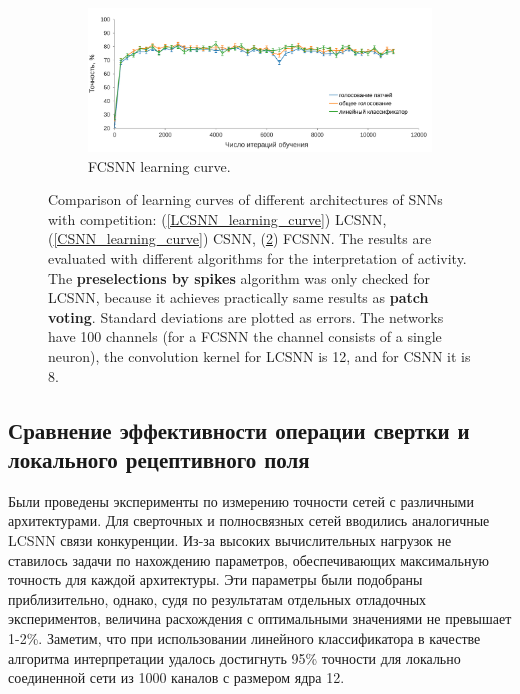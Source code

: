 \documentclass[a4paper]{article}
\begin{document}
\begin{figure}\ContinuedFloat
\begin{subfigure}{0.48\textwidth} 
    \includegraphics[width=\textwidth,keepaspectratio=true]{FCSNN_learning_rate_ru.pdf}
 \caption{FCSNN learning curve.}
 \label{FCSNN_learning_curve}
\end{subfigure}
\caption{Comparison of learning curves of different architectures of SNNs with competition: (\ref{LCSNN_learning_curve}) LCSNN, (\ref{CSNN_learning_curve}) CSNN, (\ref{FCSNN_learning_curve}) FCSNN. The results are evaluated with different algorithms for the interpretation of activity. The \textbf{preselections by spikes} algorithm was only checked for LCSNN, because it achieves practically same results as \textbf{patch voting}. Standard deviations are plotted as errors. The networks have 100 channels (for a FCSNN the channel consists of a single neuron), the convolution kernel for LCSNN is 12, and for CSNN it is 8.}
\end{figure}

\subsection{Сравнение эффективности операции свертки и локального рецептивного поля}
Были проведены эксперименты по измерению точности сетей с различными архитектурами. Для сверточных и полносвязных сетей вводились аналогичные LCSNN связи конкуренции. Из-за высоких вычислительных нагрузок не ставилось задачи по нахождению параметров, обеспечивающих максимальную точность для каждой архитектуры. Эти параметры были подобраны приблизительно, однако, судя по результатам отдельных отладочных экспериментов, величина расхождения с оптимальными значениями не превышает 1-2\%. Заметим, что при использовании линейного классификатора в качестве алгоритма интерпретации удалось достигнуть 95\% точности для локально соединенной сети из 1000 каналов с размером ядра 12.
\end{document}
